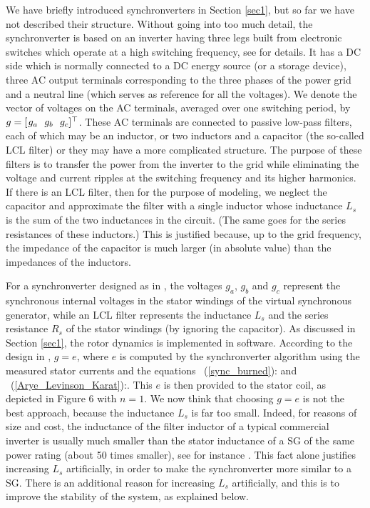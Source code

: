 \documentclass[12pt]{article}
\theoremstyle{definition}
\numberwithin{equation}{section}                        %
\newcommand{\rfb}[1]{\mbox{\rm
   (\ref{#1})}\ifx\undefined\stillediting\else:\fbox{$#1$}\fi}
\newcommand{\m}      {{\hbox{\hskip 1pt}}}
\begin{document}
We have briefly introduced synchronverters in Section \ref{sec1},
but so far we have not described their structure. Without going
into too much detail, the synchronverter is based on an inverter
having three legs built from electronic switches which operate at a
high switching frequency, see \cite{Zh_etal:14,ZhWe:11} for details.
It has a DC side which is normally connected to a DC energy source (or
a storage device), three AC output terminals corresponding to the
three phases of the power grid and a neutral line (which serves as
reference for all the voltages).  We denote the vector of voltages on
the AC terminals, averaged over one switching period, by $g=[\m g_a\ \
g_b\ \ g_c]^\top$. These AC terminals are connected to passive
low-pass filters, each of which may be an inductor, or two inductors
and a capacitor (the so-called LCL filter) or they may have a more
complicated structure. The purpose of these filters is to transfer the
power from the inverter to the grid while eliminating the voltage and
current ripples at the switching frequency and its higher harmonics.
If there is an LCL filter, then for the purpose of modeling, we
neglect the capacitor and approximate the filter with a single
inductor whose inductance $L_s$ is the sum of the two inductances in
the circuit. (The same goes for the series resistances of these
inductors.) This is justified because, up to the grid frequency, the
impedance of the capacitor is much larger (in absolute value) than the
impedances of the inductors.

For a synchronverter designed as in \cite{ZhWe:11}, the voltages
$g_a$, $g_b$ and $g_c$ represent the synchronous internal voltages in
the stator windings of the virtual synchronous generator, while an LCL
filter represents the inductance $L_s$ and the series resistance $R_s$
of the stator windings (by ignoring the capacitor). As discussed in
Section \ref{sec1}, the rotor dynamics is implemented in software.
According to the design in \cite{Zh_etal:14,ZhWe:11}, $g=e$, where $e$
is computed by the synchronverter algorithm using the measured stator
currents and the equations \rfb{sync_burned} and
\rfb{Arye_Levinson_Karat}. This $e$ is then provided to the stator
coil, as depicted in Figure 6 with $n=1$. We now think that choosing
$g=e$ is not the best approach, because the inductance $L_s$ is far
too small.  Indeed, for reasons of size and cost, the inductance of
the filter inductor of a typical commercial inverter is usually much
smaller than the stator inductance of a SG of the same power rating
(about 50 times smaller), see for instance \cite[Example 3.1]{Kun:94}.
This fact alone justifies increasing $L_s$ artificially, in order to
make the synchronverter more similar to a SG. There is an additional
reason for increasing $L_s$ artificially, and this is to improve the
stability of the system, as explained below.
\end{document}
